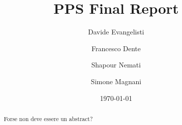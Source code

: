 \documentclass{scrartcl}
\title{\LARGE
    PPS Final Report
}
\author{
    Davide Evangelisti \\ \emailaddr{davide.evangelisti2@studio.unibo.it}
    \and 
    Francesco Dente \\ \emailaddr{francesco.dente@studio.unibo.it} 
    \and 
    Shapour Nemati \\ \emailaddr{shapour.nemati@studio.unibo.it}
    \and 
    Simone Magnani \\ \emailaddr{simone.magnani4@studio.unibo.it} 
    
}
\date{\today}
\begin{document}
\maketitle

\begin{abstract}
Forse non deve essere un abstract?
\end{abstract}













\nocite{*} %


\end{document}
